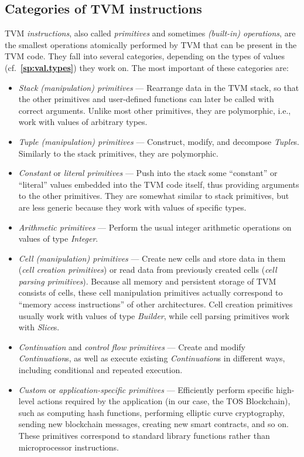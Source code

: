 \documentclass[12pt,oneside]{article}
\def\refpoint#1{{\rm\textbf{\ref{#1}}}}
\let\ptref=\refpoint
\def\mysubsection#1{\subsection{#1}\fancyhead[C]{\small{\textsc{\textrm{\thesubsection.} #1}}}}
\begin{document}
\mysubsection{Categories of TVM instructions}
TVM {\em instructions}, also called {\em primitives\/} and sometimes {\em (built-in) operations}, are the smallest operations atomically performed by TVM that can be present in the TVM code. They fall into several categories, depending on the types of values (cf.~\ptref{sp:val.types}) they work on. The most important of these categories are:
\begin{itemize}
\item {\em Stack (manipulation) primitives\/} --- Rearrange data in the TVM stack, so that the other primitives and user-defined functions can later be called with correct arguments. Unlike most other primitives, they are polymorphic, i.e., work with values of arbitrary types.
\item {\em Tuple (manipulation) primitives\/} --- Construct, modify, and decompose {\em Tuple\/}s. Similarly to the stack primitives, they are polymorphic.
\item {\em Constant\/} or {\em literal primitives\/} --- Push into the stack some ``constant'' or ``literal'' values embedded into the TVM code itself, thus providing arguments to the other primitives. They are somewhat similar to stack primitives, but are less generic because they work with values of specific types.
\item {\em Arithmetic primitives\/} --- Perform the usual integer arithmetic operations on values of type {\em Integer}.
\item {\em Cell (manipulation) primitives\/} --- Create new cells and store data in them ({\em cell creation primitives}) or read data from previously created cells ({\em cell parsing primitives}). Because all memory and persistent storage of TVM consists of cells, these cell manipulation primitives actually correspond to ``memory access instructions'' of other architectures. Cell creation primitives usually work with values of type {\em Builder}, while cell parsing primitives work with {\em Slice\/}s.
\item {\em Continuation\/} and {\em control flow primitives\/} --- Create and modify {\em Continuation\/}s, as well as execute existing {\em Continuation\/}s in different ways, including conditional and repeated execution.
\item {\em Custom\/} or {\em application-specific primitives\/} --- Efficiently perform specific high-level actions required by the application (in our case, the TOS Blockchain), such as computing hash functions, performing elliptic curve cryptography, sending new blockchain messages, creating new smart contracts, and so on. These primitives correspond to standard library functions rather than microprocessor instructions.
\end{itemize}
\end{document}
